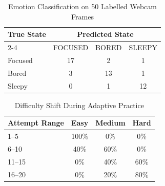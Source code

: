 \begin{table}[!htbp]
\caption{Emotion Classification on 50 Labelled Webcam Frames}
\label{tab:emotion}
\centering
\scriptsize
\renewcommand{\arraystretch}{1.12}
\begin{tabular}{lccc}
\toprule
\multirow{2}{*}{\textbf{True State}} & \multicolumn{3}{c}{\textbf{Predicted State}} \\
\cmidrule(lr){2-4}
 & FOCUSED & BORED & SLEEPY \\
\midrule
Focused & 17 & 2 & 1 \\
Bored & 3 & 13 & 1 \\
Sleepy & 0 & 1 & 12 \\
\bottomrule
\end{tabular}
\end{table}

\begin{table}[!htbp]
\caption{Difficulty Shift During Adaptive Practice}
\label{tab:difficulty}
\centering
\scriptsize
\renewcommand{\arraystretch}{1.12}
\begin{tabular}{lccc}
\toprule
\textbf{Attempt Range} & \textbf{Easy} & \textbf{Medium} & \textbf{Hard} \\
\midrule
1--5 & 100\% & 0\% & 0\% \\
6--10 & 40\% & 60\% & 0\% \\
11--15 & 0\% & 40\% & 60\% \\
16--20 & 0\% & 20\% & 80\% \\
\bottomrule
\end{tabular}
\end{table}
